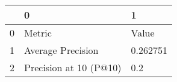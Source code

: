 \begin{tabular}{lll}
\toprule
{} &                       0 &         1 \\
\midrule
0 &                  Metric &     Value \\
1 &       Average Precision &  0.262751 \\
2 &  Precision at 10 (P@10) &       0.2 \\
\bottomrule
\end{tabular}
